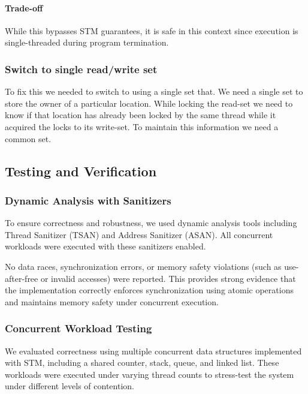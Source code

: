 \documentclass[11pt,a4paper]{article}
\begin{document}
\paragraph{Trade-off}
While this bypasses STM guarantees, it is safe in this context since execution is single-threaded during program termination.

\subsubsection{Switch to single read/write set}

To fix this we needed to switch to using a single set that. We need a single set to store the owner of a particular location. While locking the read-set we need to know if that location has already been locked by the same thread while it acquired the locks to its write-set. To maintain this information we need a common set.




\subsection{Testing and Verification}

\subsubsection{Dynamic Analysis with Sanitizers}

To ensure correctness and robustness, we used dynamic analysis tools including Thread Sanitizer (TSAN) and Address Sanitizer (ASAN). All concurrent workloads were executed with these sanitizers enabled.

No data races, synchronization errors, or memory safety violations (such as use-after-free or invalid accesses) were reported. This provides strong evidence that the implementation correctly enforces synchronization using atomic operations and maintains memory safety under concurrent execution.

\subsubsection{Concurrent Workload Testing}

We evaluated correctness using multiple concurrent data structures implemented with STM, including a shared counter, stack, queue, and linked list. These workloads were executed under varying thread counts to stress-test the system under different levels of contention.
\end{document}
